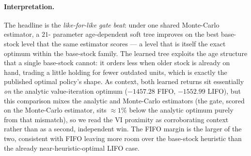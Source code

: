 \paragraph{Interpretation.}
The headline is the \emph{like-for-like gate beat}: under one shared Monte-Carlo estimator, a $21$-
parameter age-dependent soft tree improves on the best base-stock level that the same estimator scores
--- a level that is itself the exact optimum within the base-stock family. The learned tree exploits
the age structure that a single base-stock cannot: it orders less when older stock is already on hand,
trading a little holding for fewer outdated units, which is exactly the published optimal policy's
shape. As context, both learned returns sit essentially \emph{on} the analytic value-iteration optimum
($-1457.28$ FIFO, $-1552.99$ LIFO), but this comparison mixes the analytic and Monte-Carlo estimators
(the gate, scored on the Monte-Carlo estimator, sits $\approx1\%$ below the analytic optimum purely
from that mismatch), so we read the VI proximity as corroborating context rather than as a second,
independent win. The FIFO margin is the larger of the two, consistent with FIFO leaving more room over
the base-stock heuristic than the already near-heuristic-optimal LIFO case.

